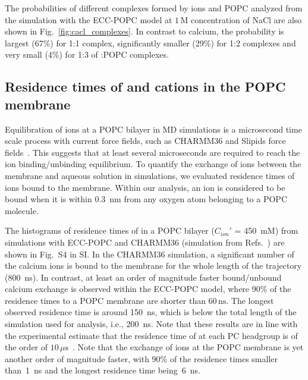 The probabilities of different complexes formed by  ions and POPC 
analyzed from the simulation with the ECC-POPC model at $1\,$M concentration of NaCl are also  
shown in Fig.~\ref{fig:cacl_complexes}. In contrast to calcium, the 
probability is largest (67\%) for 1:1 complex, significantly smaller (29\%) 
for 1:2 complexes and very small (4\%) for 1:3 of :POPC complexes. 
 
 
 
 
\subsection{Residence times of  and  cations in the POPC membrane} 
 
Equilibration of  ions at a POPC bilayer in MD simulations is a microsecond time scale process with current force fields, such  as CHARMM36 and Slipids force fields~\citep{javanainen17}. This suggests that at least several microseconds are required to reach the ion binding/unbinding equilibrium. 
To quantify the exchange of ions between the membrane and aqueous solution in simulations, we evaluated residence times of ions bound to the membrane. Within our analysis, an ion is considered to be bound when it is within 0.3~nm from any oxygen atom belonging to a POPC molecule. 
 
The histograms of residence times of  in a POPC bilayer ($C_{ion}'$ = 450~mM) from simulations with  
ECC-POPC and CHARMM36 (simulation from Refs.~\citep{javanainen17,zenodo.259376}) are shown in Fig.~S4 in SI. 
In the CHARMM36 simulation, a significant number of the calcium ions is bound to the membrane for the whole length of the trajectory (800~ns). 
In contrast, at least an order of magnitude faster bound/unbound calcium exchange is observed within the ECC-POPC model, 
where 90\% of the  residence times to a POPC membrane are shorter than $60\,\mathrm{ns}$. The longest observed 
residence time is around 150~ns, which is below the total length of the simulation used for analysis, i.e., 200~ns. 
Note that these results are in line with the experimental estimate that the residence time of  at each PC 
headgroup is of the order of $10\,\mu\mathrm{s}$~\citep{altenbach84}. Note that the exchange of  ions at the POPC membrane 
is yet another order of magnitude faster, with 90\% of the residence times smaller than~1~ns and the longest residence time being~6~ns. 
 
